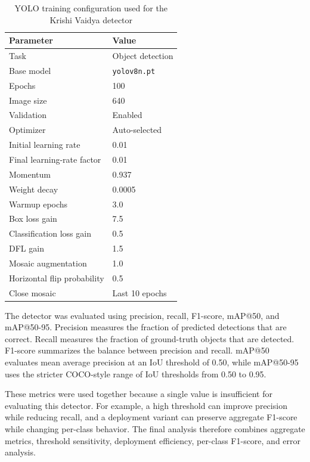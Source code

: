 \begin{table}[H]
\centering
\caption{YOLO training configuration used for the Krishi Vaidya detector}
\label{tab:yolo-training-configuration}
\begin{tabular}{@{}ll@{}}
\toprule
\textbf{Parameter} & \textbf{Value} \\
\midrule
Task & Object detection \\
Base model & \texttt{yolov8n.pt} \\
Epochs & 100 \\
Image size & 640 \\
Validation & Enabled \\
Optimizer & Auto-selected \\
Initial learning rate & 0.01 \\
Final learning-rate factor & 0.01 \\
Momentum & 0.937 \\
Weight decay & 0.0005 \\
Warmup epochs & 3.0 \\
Box loss gain & 7.5 \\
Classification loss gain & 0.5 \\
DFL gain & 1.5 \\
Mosaic augmentation & 1.0 \\
Horizontal flip probability & 0.5 \\
Close mosaic & Last 10 epochs \\
\bottomrule
\end{tabular}
\end{table}


The detector was evaluated using precision, recall, F1-score, mAP@50, and mAP@50-95. Precision
measures the fraction of predicted detections that are correct. Recall measures the fraction of
ground-truth objects that are detected. F1-score summarizes the balance between precision and
recall. mAP@50 evaluates mean average precision at an IoU threshold of 0.50, while mAP@50-95 uses
the stricter COCO-style range of IoU thresholds from 0.50 to 0.95.

These metrics were used together because a single value is insufficient for evaluating this
detector. For example, a high threshold can improve precision while reducing recall, and a
deployment variant can preserve aggregate F1-score while changing per-class behavior. The final
analysis therefore combines aggregate metrics, threshold sensitivity, deployment efficiency,
per-class F1-score, and error analysis.

